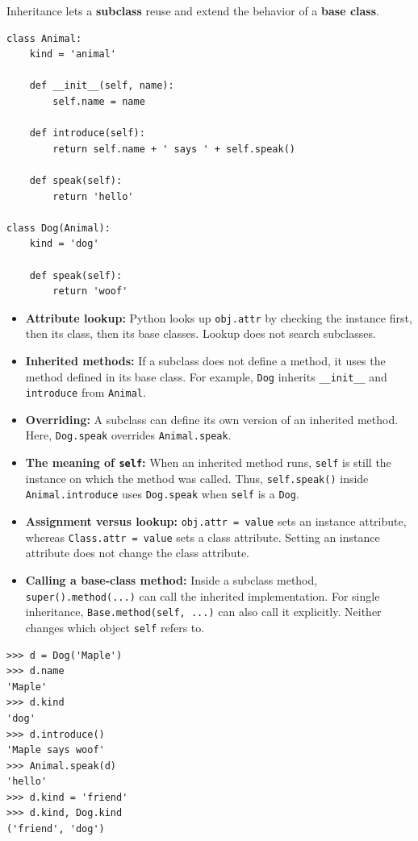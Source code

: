 Inheritance lets a \textbf{subclass} reuse and extend the behavior of a \textbf{base class}.

\begin{lstlisting}
class Animal:
    kind = 'animal'

    def __init__(self, name):
        self.name = name

    def introduce(self):
        return self.name + ' says ' + self.speak()

    def speak(self):
        return 'hello'

class Dog(Animal):
    kind = 'dog'

    def speak(self):
        return 'woof'
\end{lstlisting}

\begin{itemize}
    \item \textbf{Attribute lookup:} Python looks up \lstinline{obj.attr} by checking the instance first, then its class, then its base classes. Lookup does not search subclasses.
    \item \textbf{Inherited methods:} If a subclass does not define a method, it uses the method defined in its base class. For example, \lstinline{Dog} inherits \lstinline{__init__} and \lstinline{introduce} from \lstinline{Animal}.
    \item \textbf{Overriding:} A subclass can define its own version of an inherited method. Here, \lstinline{Dog.speak} overrides \lstinline{Animal.speak}.
    \item \textbf{The meaning of \lstinline{self}:} When an inherited method runs, \lstinline{self} is still the instance on which the method was called. Thus, \lstinline{self.speak()} inside \lstinline{Animal.introduce} uses \lstinline{Dog.speak} when \lstinline{self} is a \lstinline{Dog}.
    \item \textbf{Assignment versus lookup:} \lstinline{obj.attr = value} sets an instance attribute, whereas \lstinline{Class.attr = value} sets a class attribute. Setting an instance attribute does not change the class attribute.
    \item \textbf{Calling a base-class method:} Inside a subclass method, \lstinline{super().method(...)} can call the inherited implementation. For single inheritance, \lstinline{Base.method(self, ...)} can also call it explicitly. Neither changes which object \lstinline{self} refers to.
\end{itemize}

\begin{lstlisting}
>>> d = Dog('Maple')
>>> d.name
'Maple'
>>> d.kind
'dog'
>>> d.introduce()
'Maple says woof'
>>> Animal.speak(d)
'hello'
>>> d.kind = 'friend'
>>> d.kind, Dog.kind
('friend', 'dog')
\end{lstlisting}
